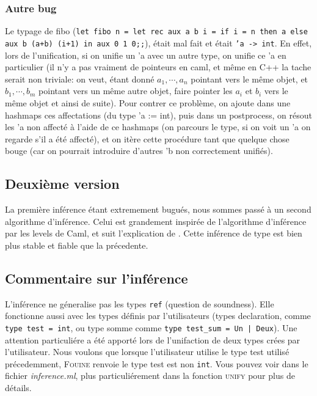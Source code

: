 \documentclass[paper=a4, fontsize=11pt, twocolumn]{article}
\begin{document}
\subsubsection{Autre bug}
Le typage de fibo (\texttt{let fibo n = let rec aux a b i = if i = n then a else aux b (a+b) (i+1) in aux 0 1 0;;}), était mal fait et était \texttt{'a -> int}. En effet, lors de l'unification, si on unifie un 'a avec un autre type, on unifie ce 'a en particulier (il n'y a pas vraiment de pointeurs en caml, et même en C++ la tache serait non triviale: on veut, étant donné $a_1,\cdots,a_n$ pointant vers le même objet, et $b_1, \cdots, b_m $ pointant vers un même autre objet, faire pointer les $a_i$ et $b_i$ vers le même objet et ainsi de suite). Pour contrer ce problème, on ajoute dans une hashmaps ces affectations (du type 'a := int), puis dans un postprocess, on résout les 'a non affecté à l'aide de ce hashmaps (on parcours le type, si on voit un 'a on regarde s'il a été affecté), et on itère cette procédure tant que quelque chose bouge (car on pourrait introduire d'autres 'b non correctement unifiés).

\subsection{Deuxième version}
La première inférence étant extremement bugués, nous sommes passé à un second algorithme d'inférence. Celui est grandement inspirée de l'algorithme d'inférence par les levels de Caml, et suit l'explication de \cite{Type}. Cette inférence de type est bien plus stable et fiable que la précedente.

\subsection{Commentaire sur l'inférence}
L'inférence ne géneralise pas les types \texttt{ref} (question de soundness). Elle fonctionne aussi avec les types définis par l'utilisateurs (types declaration, comme \texttt{type test = int}, ou type somme comme \texttt{type test\_sum = Un | Deux}). Une attention particuliére a été apporté lors de l'unifaction de deux types crées par l'utilisateur. Nous voulons que lorsque l'utilisateur utilise le type test utilisé précedemment, \textsc{Fouine} renvoie le type test est non \texttt{int}. Vous pouvez voir dans le fichier \textit{inference.ml}, plus particuliérement dans la fonction \textsc{unify} pour plus de détails.
\end{document}

